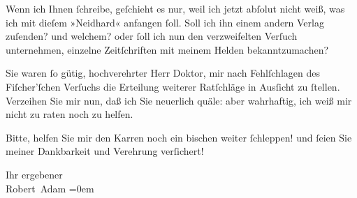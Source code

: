 \pstart
           Wenn ich Ihnen{ }ſchreibe, geſchieht es nur, weil ich jetzt abſolut nicht weiß, was ich
               mit dieſem »Neidhard« anfangen{ }ſoll. Soll ich
               ihn einem andern Verlag zuſenden? und welchem? oder{ }ſoll ich nun den verzweifelten
               Verſuch unternehmen, einzelne Zeitſchriften mit meinem Helden bekanntzumachen?\pend
           
\pstart
           Sie waren{ }ſo gütig, hochverehrter Herr Doktor, mir nach Fehlſchlagen des Fiſcher’ſchen Verſuchs die Erteilung weiterer
               Ratſchläge in Ausſicht zu{ }ſtellen. Verzeihen Sie mir nun, daß ich Sie neuerlich
               quäle: aber wahrhaftig, ich weiß mir nicht zu raten noch zu helfen.\pend
           
\pstart
           Bitte, helfen Sie mir den Karren noch ein bischen weiter{ }ſchleppen! und{ }ſeien Sie
               meiner Dankbarkeit und {\pb}Verehrung verſichert!\pend
           
\pstart
           Ihr ergebener{\\[\baselineskip]}\spacefill\mbox{Robert Adam}\pend
           \leftskip=0em{}\endnumbering{}  \newcommand{\dateiname}{L02009}\newcommand{\titel}{Robert Adam an Arthur Schnitzler, 9. 2. 1911}\newcommand{\editorInnen}{Martin Anton Müller und Gerd-Hermann Susen}
